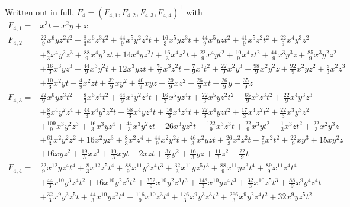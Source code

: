 \documentclass[11pt]{article}
\theoremstyle{plain}
\theoremstyle{definition}
\theoremstyle{remark}
\begin{document}
Written out in full, $F_4=(F_{4,1},F_{4,2},F_{4,3},F_{4,4})^{\mathsf T}$ with
{\small
\begin{align*}
F_{4,1} ={}& x^3t+x^2y+x\\[2pt]
F_{4,2} ={}&\tfrac{22}{9}x^6yz^2t^2+\tfrac{8}{3}x^6z^3t^2+\tfrac{44}{9}x^5y^2z^2t+\tfrac{16}{3}x^5yz^3t+\tfrac{44}{9}x^5yzt^2+\tfrac{41}{9}x^5z^2t^2+\tfrac{22}{9}x^4y^3z^2\\
&+\tfrac{8}{3}x^4y^2z^3+\tfrac{88}{9}x^4y^2zt+14x^4yz^2t+\tfrac{16}{3}x^4z^3t+\tfrac{22}{9}x^4yt^2+\tfrac{10}{9}x^4zt^2+\tfrac{44}{9}x^3y^3z+\tfrac{85}{9}x^3y^2z^2\\
&+\tfrac{16}{3}x^3yz^3+\tfrac{44}{9}x^3y^2t+12x^3yzt+\tfrac{70}{9}x^3z^2t-\tfrac{7}{9}x^3t^2+\tfrac{22}{9}x^2y^3+\tfrac{98}{9}x^2y^2z+\tfrac{92}{9}x^2yz^2+\tfrac{8}{3}x^2z^3\\
&+\tfrac{10}{3}x^2yt-\tfrac{4}{9}x^2zt+\tfrac{37}{9}xy^2+\tfrac{40}{9}xyz+\tfrac{29}{9}xz^2-\tfrac{26}{9}xt-\tfrac{26}{9}y-\tfrac{35}{9}z\\[2pt]
F_{4,3} ={}& \tfrac{22}{9}x^6yz^3t^2+\tfrac{8}{3}x^6z^4t^2+\tfrac{44}{9}x^5y^2z^3t+\tfrac{16}{3}x^5yz^4t+\tfrac{22}{3}x^5yz^2t^2+\tfrac{65}{9}x^5z^3t^2+\tfrac{22}{9}x^4y^3z^3\\
&+\tfrac{8}{3}x^4y^2z^4+\tfrac{44}{3}x^4y^2z^2t+\tfrac{58}{3}x^4yz^3t+\tfrac{16}{3}x^4z^4t+\tfrac{22}{3}x^4yzt^2+\tfrac{17}{3}x^4z^2t^2+\tfrac{22}{3}x^3y^3z^2\\
&+\tfrac{109}{9}x^3y^2z^3+\tfrac{16}{3}x^3yz^4+\tfrac{44}{3}x^3y^2zt+26x^3yz^2t+\tfrac{122}{9}x^3z^3t+\tfrac{22}{9}x^3yt^2+\tfrac{1}{3}x^3zt^2+\tfrac{22}{3}x^2y^3z\\
&+\tfrac{61}{3}x^2y^2z^2+16x^2yz^3+\tfrac{8}{3}x^2z^4+\tfrac{44}{9}x^2y^2t+\tfrac{46}{3}x^2yzt+\tfrac{26}{3}x^2z^2t-\tfrac{7}{9}x^2t^2+\tfrac{22}{9}xy^3+15xy^2z\\
&+16xyz^2+\tfrac{19}{3}xz^3+\tfrac{10}{3}xyt-2xzt+\tfrac{37}{9}y^2+\tfrac{16}{3}yz+\tfrac{11}{3}z^2-\tfrac{22}{9}t\\[2pt]
F_{4,4} ={}& \tfrac{22}{9}x^{12}yz^4t^4+\tfrac{8}{3}x^{12}z^5t^4+\tfrac{88}{9}x^{11}y^2z^4t^3+\tfrac{32}{3}x^{11}yz^5t^3+\tfrac{88}{9}x^{11}yz^3t^4+\tfrac{89}{9}x^{11}z^4t^4\\
&+\tfrac{44}{3}x^{10}y^3z^4t^2+16x^{10}y^2z^5t^2+\tfrac{352}{9}x^{10}y^2z^3t^3+\tfrac{148}{3}x^{10}yz^4t^3+\tfrac{32}{3}x^{10}z^5t^3+\tfrac{88}{9}x^9y^4z^4t\\
&+\tfrac{32}{3}x^9y^3z^5t+\tfrac{44}{3}x^{10}yz^2t^4+\tfrac{116}{9}x^{10}z^3t^4+\tfrac{176}{3}x^9y^3z^3t^2+\tfrac{266}{3}x^9y^2z^4t^2+32x^9yz^5t^2\\

\end{align*}}
\end{document}
